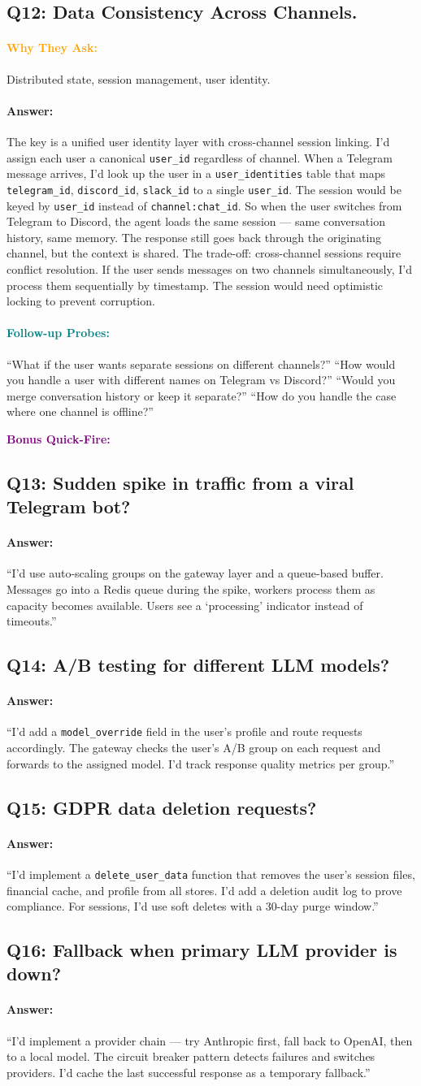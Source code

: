 \documentclass[11pt,a4paper]{article}
\newcommand{\Q}[1]{\subsection{#1}}
\newcommand{\Ans}[1]{\paragraph{\textbf{Answer:}} #1}
\newcommand{\Why}{\paragraph{\textcolor{orange}{\textbf{Why They Ask:}}}}
\newcommand{\Probe}{\paragraph{\textcolor{teal}{\textbf{Follow-up Probes:}}}}
\begin{document}
\Q{Q12: Data Consistency Across Channels.}
\Why Distributed state, session management, user identity.
\Ans The key is a unified user identity layer with cross-channel session linking. I'd assign each user a canonical \texttt{user\_id} regardless of channel. When a Telegram message arrives, I'd look up the user in a \texttt{user\_identities} table that maps \texttt{telegram\_id}, \texttt{discord\_id}, \texttt{slack\_id} to a single \texttt{user\_id}. The session would be keyed by \texttt{user\_id} instead of \texttt{channel:chat\_id}. So when the user switches from Telegram to Discord, the agent loads the same session --- same conversation history, same memory. The response still goes back through the originating channel, but the context is shared. The trade-off: cross-channel sessions require conflict resolution. If the user sends messages on two channels simultaneously, I'd process them sequentially by timestamp. The session would need optimistic locking to prevent corruption.
\Probe ``What if the user wants separate sessions on different channels?'' ``How would you handle a user with different names on Telegram vs Discord?'' ``Would you merge conversation history or keep it separate?'' ``How do you handle the case where one channel is offline?''

\textcolor{purple}{\textbf{Bonus Quick-Fire:}}

\Q{Q13: Sudden spike in traffic from a viral Telegram bot?}
\Ans ``I'd use auto-scaling groups on the gateway layer and a queue-based buffer. Messages go into a Redis queue during the spike, workers process them as capacity becomes available. Users see a `processing' indicator instead of timeouts.''

\Q{Q14: A/B testing for different LLM models?}
\Ans ``I'd add a \texttt{model\_override} field in the user's profile and route requests accordingly. The gateway checks the user's A/B group on each request and forwards to the assigned model. I'd track response quality metrics per group.''

\Q{Q15: GDPR data deletion requests?}
\Ans ``I'd implement a \texttt{delete\_user\_data} function that removes the user's session files, financial cache, and profile from all stores. I'd add a deletion audit log to prove compliance. For sessions, I'd use soft deletes with a 30-day purge window.''

\Q{Q16: Fallback when primary LLM provider is down?}
\Ans ``I'd implement a provider chain --- try Anthropic first, fall back to OpenAI, then to a local model. The circuit breaker pattern detects failures and switches providers. I'd cache the last successful response as a temporary fallback.''
\end{document}

